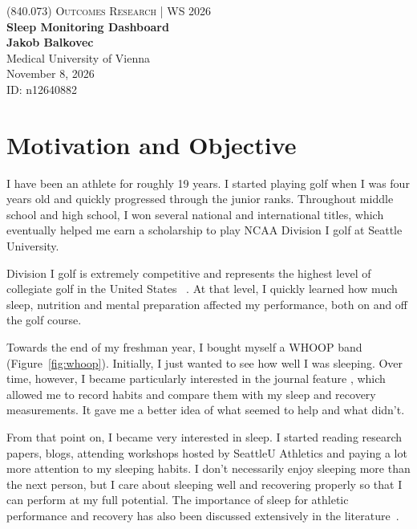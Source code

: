\documentclass[11pt,a4paper]{article}
\begin{document}
\begin{flushleft}
    {\small\color{gray}\textsc{(840.073) Outcomes Research | WS 2026}}\\[10pt]

    {\fontsize{18}{20}\selectfont\bfseries
    Sleep Monitoring Dashboard}\\[5pt]

    {\normalsize\textbf{Jakob Balkovec}}\\[3pt]
    {\small Medical University of Vienna}\\
    {\small November 8, 2026} \\
    {\small ID: n12640882}
\end{flushleft}

\vspace{0.3cm}

\section{Motivation and Objective}
\label{sec:motivation}

I have been an athlete for roughly 19 years. I started playing golf when I was four years old and quickly progressed through
the junior ranks. Throughout middle school and high school, I won several national and international titles, which eventually helped me earn a scholarship to play NCAA Division I golf at Seattle University.

Division I golf is extremely competitive and represents the highest level of collegiate golf in the United States ~\cite{ncaa2026}. At that level, I quickly learned how much sleep, nutrition and mental preparation affected my performance, both on and off the golf course.

Towards the end of my freshman year, I bought myself a WHOOP band~\cite{whoop101} (Figure~\ref{fig:whoop}). Initially, I just wanted to see how well I was sleeping. Over time, however, I became particularly interested in the journal feature \cite{whoop2026journal}, which allowed me to record habits and compare them with my sleep and recovery measurements. It gave me a better idea of what seemed to help and what didn't.

From that point on, I became very interested in sleep. I started reading research papers, blogs, attending workshops hosted by SeattleU Athletics and paying a lot more attention to my sleeping habits. I don't necessarily enjoy sleeping more than the next person, but I care about sleeping well and recovering properly so that I can perform at my full potential. The importance of sleep for athletic performance and recovery has also been discussed extensively in the literature~\cite{walsh2021sleep}.
\end{document}
